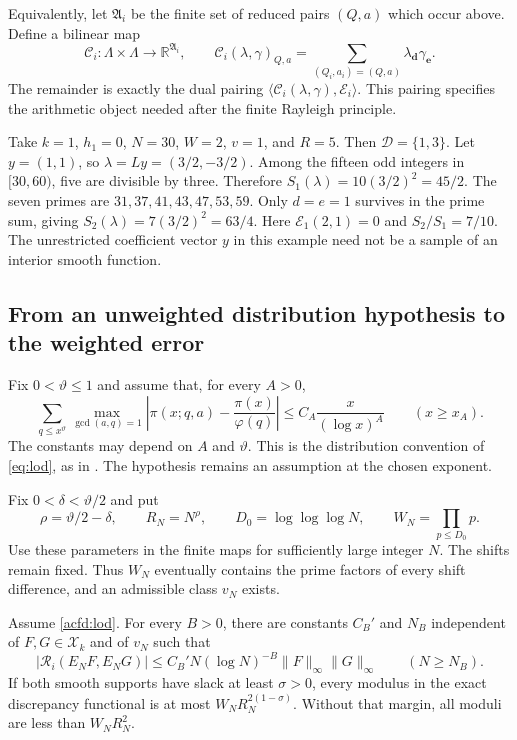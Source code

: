 Equivalently, let $\mathfrak A_i$ be the finite set of reduced pairs $(Q,a)$
which occur above.  Define a bilinear map
\[
 \mathcal C_i:\Lambda\times\Lambda\longrightarrow\mathbb R^{\mathfrak A_i},
 \qquad
 \mathcal C_i(\lambda,\gamma)_{Q,a}
    =\sum_{(Q_i,a_i)=(Q,a)}\lambda_{\boldsymbol d}\gamma_{\boldsymbol e}.
\]
The remainder is exactly the dual pairing
$\langle\mathcal C_i(\lambda,\gamma),\mathcal E_i\rangle$.
This pairing specifies the arithmetic object needed after the finite Rayleigh principle.

\begin{example}
Take\label{acfd:first-model} $k=1$, $h_1=0$, $N=30$, $W=2$, $v=1$, and $R=5$.
Then $\mathcal D=\{1,3\}$.  Let $y=(1,1)$, so
$\lambda=Ly=(3/2,-3/2)$.
Among the fifteen odd integers in $[30,60)$, five are divisible by three.
Therefore $S_1(\lambda)=10(3/2)^2=45/2$.
The seven primes are $31,37,41,43,47,53,59$.
Only $d=e=1$ survives in the prime sum, giving
$S_2(\lambda)=7(3/2)^2=63/4$.
Here $\mathcal E_1(2,1)=0$ and $S_2/S_1=7/10$.
The unrestricted coefficient vector $y$ in this example need not be a
sample of an interior smooth function.
\end{example}

\subsection{From an unweighted distribution hypothesis to the weighted error}

Fix $0<\vartheta\leq1$ and assume that, for every $A>0$,
\begin{equation}\label{acfd:lod}
 \sum_{q\leq x^\vartheta}\max_{\gcd(a,q)=1}
 \left|\pi(x;q,a)-\frac{\pi(x)}{\varphi(q)}\right|
       \leq C_A\frac{x}{(\log x)^A}
       \qquad(x\geq x_A).
\end{equation}
The constants may depend on $A$ and $\vartheta$.
This is the distribution convention of \eqref{eq:lod}, as in
\cite[(1.3), p.~384]{Maynard}.
The hypothesis remains an assumption at the chosen exponent.

Fix $0<\delta<\vartheta/2$ and put
\[
 \rho=\vartheta/2-\delta,\qquad
 R_N=N^\rho,\qquad D_0=\log\log\log N,\qquad
 W_N=\prod_{p\leq D_0}p.
\]
Use these parameters in the finite maps for sufficiently large integer $N$.
The shifts remain fixed.  Thus $W_N$ eventually contains the prime factors
of every shift difference, and an admissible class $v_N$ exists.

\begin{theorem}\label{acfd:lod-transfer}
Assume \eqref{acfd:lod}.  For every $B>0$, there are constants
$C_B'$ and $N_B$ independent of $F,G\in\mathcal X_k$ and of $v_N$ such that
\begin{equation}\label{acfd:remainder-decay}
 |\mathcal R_i(E_NF,E_NG)|
       \leq C_B' N(\log N)^{-B}\|F\|_\infty\|G\|_\infty
       \qquad(N\geq N_B).
\end{equation}
If both smooth supports have slack at least $\sigma>0$, every modulus
in the exact discrepancy functional is at most
$W_NR_N^{2(1-\sigma)}$.
Without that margin, all moduli are less than $W_NR_N^2$.
\end{theorem}

